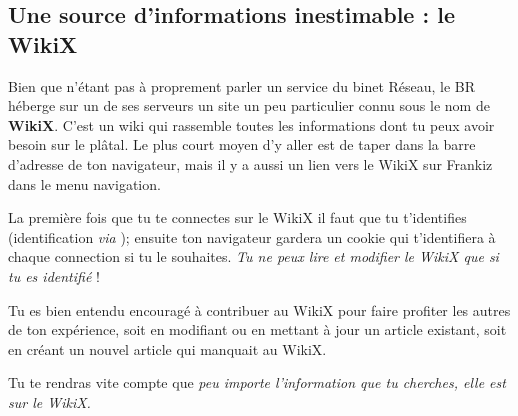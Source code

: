 
\subsection{Une source d'informations inestimable : le WikiX}
\label{WikiX}
Bien que n'\'etant pas \`a proprement parler un service du binet R\'eseau, le BR h\'eberge sur un de ses serveurs un site un peu particulier connu sous le nom de \textbf{WikiX}.
C'est un wiki qui rassemble toutes les informations dont tu peux avoir besoin sur le pl\^atal.
Le plus court moyen d'y aller est de taper  dans la barre d'adresse de ton navigateur, mais il y a aussi un lien vers le WikiX sur Frankiz dans le menu navigation.

La premi\`ere fois que tu te connectes sur le WikiX il faut que tu t'identifies (identification \emph{via} );
ensuite ton navigateur gardera un cookie qui t'identifiera \`a chaque connection si tu le souhaites. \emph{Tu ne peux lire et modifier le WikiX que si tu es identifi\'e} !

Tu es bien entendu encourag\'e \`a contribuer au WikiX pour faire profiter les autres de ton exp\'erience, 
soit en modifiant ou en mettant \`a jour un article existant, soit en cr\'eant un nouvel article qui manquait au WikiX.


Tu te rendras vite compte que \emph{peu importe l'information que tu cherches, elle est sur le WikiX.}
